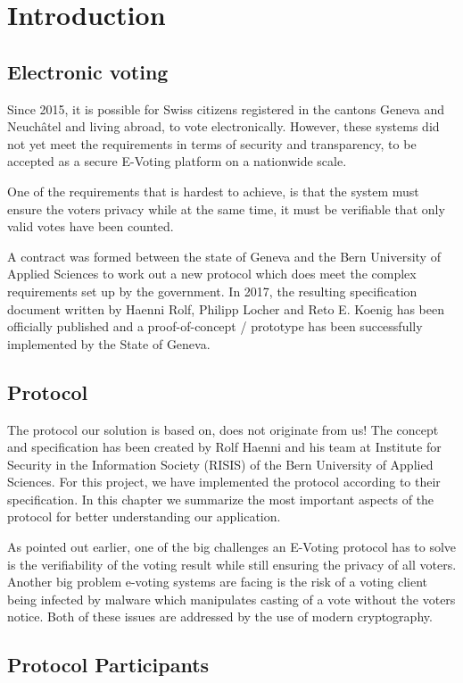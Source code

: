 \chapter{Introduction}
\section{Electronic voting}
Since 2015, it is possible for Swiss citizens registered in the cantons Geneva and Neuchâtel and living abroad, to vote electronically. However, these systems did not yet meet the requirements in terms of security and transparency, to be accepted as a secure E-Voting platform on a nationwide scale.

One of the requirements that is hardest to achieve, is that the system must ensure the voters privacy while at the same time, it must be verifiable that only valid votes have been counted.

A contract was formed between the state of Geneva and the Bern University of Applied Sciences to work out a new protocol which does meet the complex requirements set up by the government. In 2017, the resulting specification document written by Haenni Rolf, Philipp Locher and Reto E. Koenig has been officially published and a proof-of-concept / prototype has been successfully implemented by the State of Geneva. 

\section{Protocol}
The protocol our solution is based on, does not originate from us! The concept and specification has been created by Rolf Haenni and his team at Institute for Security in the Information Society (RISIS) of the Bern University of Applied Sciences. For this project, we have implemented the protocol according to their specification. In this chapter we summarize the most important aspects of the protocol for better understanding our application.

As pointed out earlier, one of the big challenges an E-Voting protocol has to solve is the verifiability of the voting result while still ensuring the privacy of all voters. Another big problem e-voting systems are facing is the risk of a voting client being infected by malware which manipulates casting of a vote without the voters notice. Both of these issues are addressed by the use of modern cryptography.

\section{Protocol Participants}
